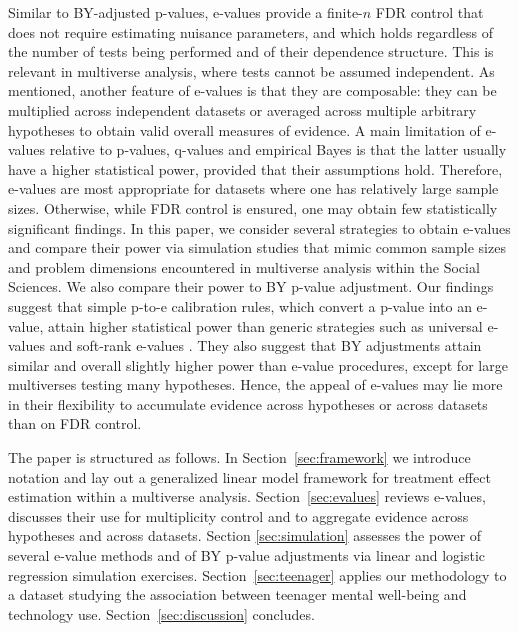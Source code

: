 \documentclass[pdflatex,sn-mathphys-num]{sn-jnl}%
\theoremstyle{thmstyleone}%
\theoremstyle{thmstyletwo}%
\theoremstyle{thmstylethree}%
\begin{document}
\color{blue} Similar to BY-adjusted p-values, \color{black} e-values provide a finite-$n$ FDR control that does not require estimating nuisance parameters, and which holds regardless of the number of tests being performed and of their dependence structure. This is relevant in multiverse analysis, where tests cannot be assumed independent.
As mentioned, another feature of e-values is that they are composable: \color{blue} they can be multiplied across independent datasets or averaged across multiple arbitrary hypotheses %
to obtain valid overall measures of evidence. \color{black}
A main limitation of e-values relative to p-values, q-values and empirical Bayes is that the latter usually have a higher statistical power, provided that their assumptions hold. 
Therefore, e-values are most appropriate for datasets where one has relatively large sample sizes. Otherwise, while FDR control is ensured, one may obtain few statistically significant findings. In this paper, we consider several strategies to obtain e-values and compare their power via simulation studies that mimic common sample sizes and problem dimensions encountered in multiverse analysis within the Social Sciences. \color{blue} We also compare their power to BY p-value adjustment. \color{black} Our findings suggest that simple p-to-e calibration rules, which convert a p-value into an e-value, attain higher statistical power than generic strategies such as universal e-values \citep{wasserman:2020} and soft-rank e-values \citep{koning:2023}. \color{blue} They also suggest that BY adjustments attain similar and overall slightly higher power than e-value procedures, except for large multiverses testing many hypotheses. Hence, the appeal of e-values may lie more in their flexibility to accumulate evidence across hypotheses or across datasets than on FDR control. \color{black}


The paper is structured as follows. In Section~\ref{sec:framework} we introduce notation and lay out a generalized linear model framework for treatment effect estimation within a multiverse analysis.
Section~\ref{sec:evalues} reviews e-values, discusses their use for multiplicity control \color{blue} and to aggregate evidence across hypotheses and across datasets. \color{black}
Section \ref{sec:simulation} assesses the power of several e-value methods \color{blue} and of BY p-value adjustments \color{black} via linear and logistic regression simulation exercises.
Section~\ref{sec:teenager} applies our methodology to a dataset studying the association between teenager mental well-being and technology use.
Section~\ref{sec:discussion} concludes.
\end{document}
